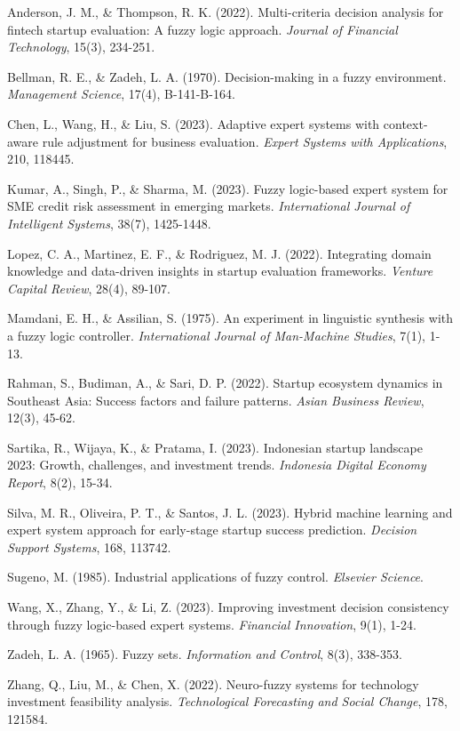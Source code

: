 \documentclass[12pt,a4paper]{article}
\begin{document}

\begin{thebibliography}{99}

Anderson, J. M., \& Thompson, R. K. (2022). Multi-criteria decision analysis for fintech startup evaluation: A fuzzy logic approach. \textit{Journal of Financial Technology}, 15(3), 234-251.

Bellman, R. E., \& Zadeh, L. A. (1970). Decision-making in a fuzzy environment. \textit{Management Science}, 17(4), B-141-B-164.

Chen, L., Wang, H., \& Liu, S. (2023). Adaptive expert systems with context-aware rule adjustment for business evaluation. \textit{Expert Systems with Applications}, 210, 118445.

Kumar, A., Singh, P., \& Sharma, M. (2023). Fuzzy logic-based expert system for SME credit risk assessment in emerging markets. \textit{International Journal of Intelligent Systems}, 38(7), 1425-1448.

Lopez, C. A., Martinez, E. F., \& Rodriguez, M. J. (2022). Integrating domain knowledge and data-driven insights in startup evaluation frameworks. \textit{Venture Capital Review}, 28(4), 89-107.

Mamdani, E. H., \& Assilian, S. (1975). An experiment in linguistic synthesis with a fuzzy logic controller. \textit{International Journal of Man-Machine Studies}, 7(1), 1-13.

Rahman, S., Budiman, A., \& Sari, D. P. (2022). Startup ecosystem dynamics in Southeast Asia: Success factors and failure patterns. \textit{Asian Business Review}, 12(3), 45-62.

Sartika, R., Wijaya, K., \& Pratama, I. (2023). Indonesian startup landscape 2023: Growth, challenges, and investment trends. \textit{Indonesia Digital Economy Report}, 8(2), 15-34.

Silva, M. R., Oliveira, P. T., \& Santos, J. L. (2023). Hybrid machine learning and expert system approach for early-stage startup success prediction. \textit{Decision Support Systems}, 168, 113742.

Sugeno, M. (1985). Industrial applications of fuzzy control. \textit{Elsevier Science}.

Wang, X., Zhang, Y., \& Li, Z. (2023). Improving investment decision consistency through fuzzy logic-based expert systems. \textit{Financial Innovation}, 9(1), 1-24.

Zadeh, L. A. (1965). Fuzzy sets. \textit{Information and Control}, 8(3), 338-353.

Zhang, Q., Liu, M., \& Chen, X. (2022). Neuro-fuzzy systems for technology investment feasibility analysis. \textit{Technological Forecasting and Social Change}, 178, 121584.

\end{thebibliography}
\end{document}
